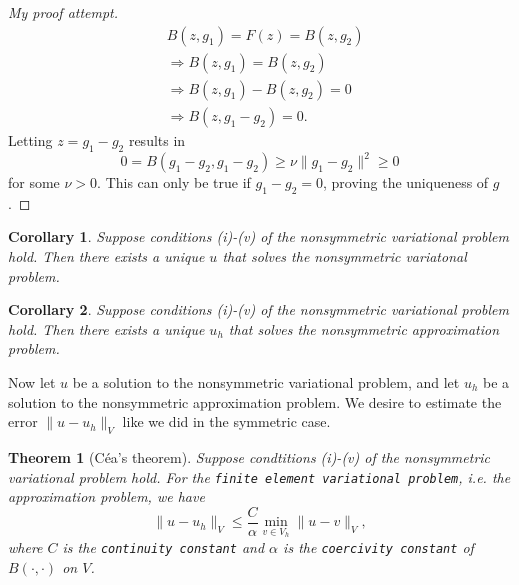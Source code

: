 \documentclass[11pt]{article}
\newtheorem{theorem}{Theorem}
\newtheorem{corollary}{Corollary}
\theoremstyle{definition}
\begin{document}
\begin{proof}[My proof attempt]
\begin{equation*}
		\begin{aligned}
			&B(z,g_1) = F(z) = B(z,g_2) \\
			&\Rightarrow B(z,g_1) = B(z,g_2) \\
			&\Rightarrow B(z,g_1) - B(z,g_2) = 0 \\
			&\Rightarrow B(z,g_1 - g_2) = 0.
		\end{aligned}
	\end{equation*}
	Letting $z= g_1 - g_2$ results in
	\begin{equation*}
		0 = B(g_1 - g_2, g_1 - g_2) \geq \nu \|g_1 - g_2\|^2 \geq 0
	\end{equation*}
	for some $\nu >0$. This can only be true if $g_1 - g_2 = 0$, proving the uniqueness of $g$.
\end{proof}

\begin{corollary}
	Suppose conditions (i)-(v) of the nonsymmetric variational problem hold. Then there exists a unique $u$ that solves the nonsymmetric variatonal problem.
\end{corollary}

\begin{corollary}
	Suppose conditions (i)-(v) of the nonsymmetric variational problem hold. Then there exists a unique $u_h$ that solves the nonsymmetric approximation problem.
\end{corollary}

Now let $u$ be a solution to the nonsymmetric variational problem, and let $u_h$ be a solution to the nonsymmetric approximation problem.
We desire to estimate the error $\|u - u_h\|_V$ like we did in the symmetric case.

\begin{theorem}[C\'{e}a's theorem]
	Suppose condtitions (i)-(v) of the nonsymmetric variational problem hold. For the \texttt{finite element variational problem},
	i.e. the approximation problem, we have
	\begin{equation*}
		\|u - u_h\|_V \leq \frac{C}{\alpha}\min_{v \in V_h}\|u - v\|_V,
	\end{equation*}
	where $C$ is the \texttt{continuity constant} and $\alpha$ is the \texttt{coercivity constant} of $B(\cdot, \cdot)$ on $V$.
\end{theorem}


\newpage
\end{document}
